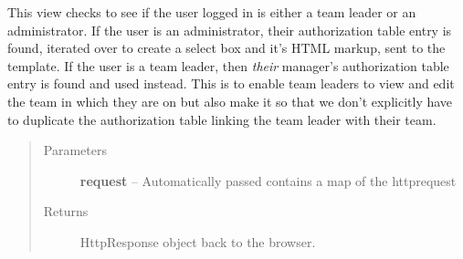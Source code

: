 \documentclass[letterpaper,10pt,english]{sphinxmanual}
\begin{document}

\begin{fulllineitems}
\label{timetracker:timetracker.views.admin_view}
This view checks to see if the user logged in is either a team leader or
an administrator. If the user is an administrator, their authorization
table entry is found, iterated over to create a select box and it's HTML
markup, sent to the template. If the user is a team leader, then \emph{their}
manager's authorization table entry is found and used instead. This is to
enable team leaders to view and edit the team in which they are on but
also make it so that we don't explicitly have to duplicate the
authorization table linking the team leader with their team.
\begin{quote}\begin{description}
\item[{Parameters}] \leavevmode
\textbf{request} -- Automatically passed contains a map of the httprequest

\item[{Returns}] \leavevmode
HttpResponse object back to the browser.

\end{description}\end{quote}

\end{fulllineitems}

\end{document}
